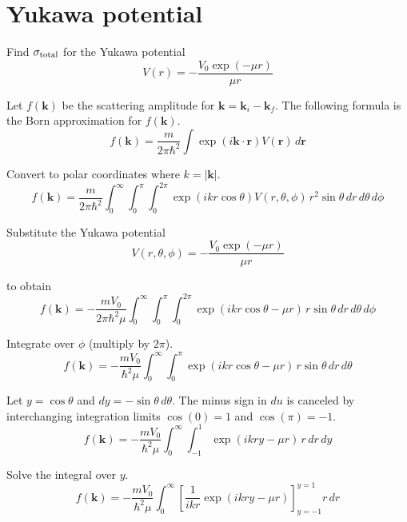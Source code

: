 

\section*{Yukawa potential}

Find $\sigma_{\rm total}$ for the Yukawa potential
\begin{equation*}
V(r)=-\frac{V_0\exp(-\mu r)}{\mu r}
\end{equation*}

Let $f(\mathbf k)$ be the scattering amplitude for $\mathbf k=\mathbf k_i-\mathbf k_f$.
The following formula is the Born approximation for $f(\mathbf k)$.
\begin{equation*}
f(\mathbf k)
=\frac{m}{2\pi\hbar^2}
\int\exp(i\mathbf k\cdot\mathbf r)V(\mathbf r)\,d\mathbf r
\end{equation*}

Convert to polar coordinates where $k=|\mathbf k|$.
\begin{equation*}
f(\mathbf k)
=\frac{m}{2\pi\hbar^2}
\int_0^\infty
\int_0^\pi
\int_0^{2\pi}
\exp(ikr\cos\theta)V(r,\theta,\phi)
\,r^2\sin\theta\,dr\,d\theta\,d\phi
\end{equation*}

Substitute the Yukawa potential
\begin{equation*}
V(r,\theta,\phi)=-\frac{V_0\exp(-\mu r)}{\mu r}
\end{equation*}

to obtain
\begin{equation*}
f(\mathbf k)
=-\frac{mV_0}{2\pi\hbar^2\mu}
\int_0^\infty
\int_0^\pi
\int_0^{2\pi}
\exp(ikr\cos\theta-\mu r)
\,r\sin\theta\,dr\,d\theta\,d\phi
\end{equation*}

Integrate over $\phi$ (multiply by $2\pi$).
\begin{equation*}
f(\mathbf k)
=-\frac{mV_0}{\hbar^2\mu}
\int_0^\infty
\int_0^\pi
\exp(ikr\cos\theta-\mu r)
\,r\sin\theta\,dr\,d\theta
\end{equation*}

Let $y=\cos\theta$ and $dy=-\sin\theta\,d\theta$.
The minus sign in $du$ is canceled by interchanging integration limits
$\cos(0)=1$ and $\cos(\pi)=-1$.
\begin{equation*}
f(\mathbf k)
=-\frac{mV_0}{\hbar^2\mu}
\int_0^\infty
\int_{-1}^1
\exp(ikry-\mu r)
\,r\,dr\,dy
\end{equation*}

Solve the integral over $y$.
\begin{equation*}
f(\mathbf k)=-\frac{mV_0}{\hbar^2\mu}
\int_0^\infty
\left[\frac{1}{ikr}\exp(ikry-\mu r)\right]_{y=-1}^{y=1}
r\,dr
\end{equation*}

